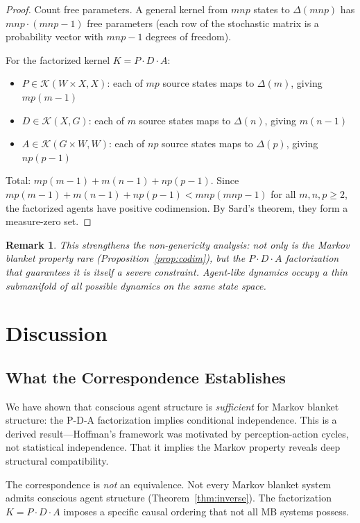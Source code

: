 \documentclass[11pt,a4paper]{article}
\newtheorem*{remark}{Remark}
\newcommand{\Kern}{\mathcal{K}}
\begin{document}
\begin{proof}
Count free parameters. A general kernel from $mnp$ states to $\Delta(mnp)$ has $mnp \cdot (mnp - 1)$ free parameters (each row of the stochastic matrix is a probability vector with $mnp - 1$ degrees of freedom).

For the factorized kernel $K = P \cdot D \cdot A$:
\begin{itemize}[nosep]
    \item $P \in \Kern(W \times X, X)$: each of $mp$ source states maps to $\Delta(m)$, giving $mp(m-1)$
    \item $D \in \Kern(X, G)$: each of $m$ source states maps to $\Delta(n)$, giving $m(n-1)$
    \item $A \in \Kern(G \times W, W)$: each of $np$ source states maps to $\Delta(p)$, giving $np(p-1)$
\end{itemize}
Total: $mp(m-1) + m(n-1) + np(p-1)$. Since $mp(m-1) + m(n-1) + np(p-1) < mnp(mnp - 1)$ for all $m, n, p \geq 2$, the factorized agents have positive codimension. By Sard's theorem, they form a measure-zero set.
\end{proof}

\begin{remark}
This strengthens the non-genericity analysis: not only is the Markov blanket property rare (Proposition~\ref{prop:codim}), but the $P \cdot D \cdot A$ factorization that guarantees it is itself a severe constraint. Agent-like dynamics occupy a thin submanifold of all possible dynamics on the same state space.
\end{remark}

\section{Discussion}

\subsection{What the Correspondence Establishes}

We have shown that conscious agent structure is \emph{sufficient} for Markov blanket structure: the P-D-A factorization implies conditional independence. This is a derived result---Hoffman's framework was motivated by perception-action cycles, not statistical independence. That it implies the Markov property reveals deep structural compatibility.

The correspondence is \emph{not} an equivalence. Not every Markov blanket system admits conscious agent structure (Theorem~\ref{thm:inverse}). The factorization $K = P \cdot D \cdot A$ imposes a specific causal ordering that not all MB systems possess.
\end{document}
